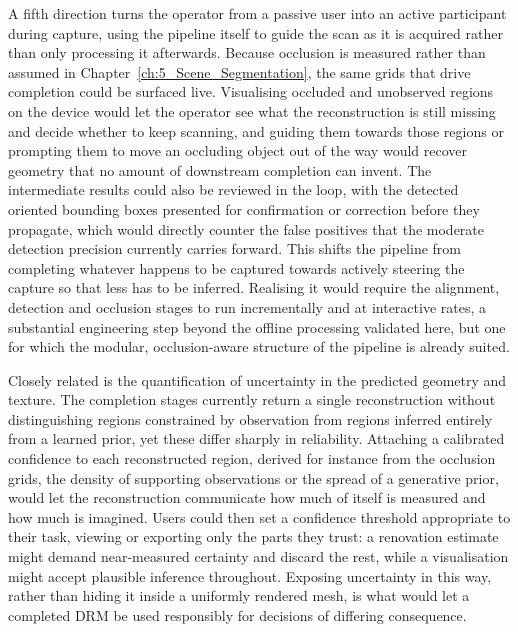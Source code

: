 A fifth direction turns the operator from a passive user into an active participant during capture, using the pipeline itself to guide the scan as it is acquired rather than only processing it afterwards. Because occlusion is measured rather than assumed in Chapter~\ref{ch:5_Scene_Segmentation}, the same grids that drive completion could be surfaced live. Visualising occluded and unobserved regions on the device would let the operator see what the reconstruction is still missing and decide whether to keep scanning, and guiding them towards those regions or prompting them to move an occluding object out of the way would recover geometry that no amount of downstream completion can invent. The intermediate results could also be reviewed in the loop, with the detected oriented bounding boxes presented for confirmation or correction before they propagate, which would directly counter the false positives that the moderate detection precision currently carries forward. This shifts the pipeline from completing whatever happens to be captured towards actively steering the capture so that less has to be inferred. Realising it would require the alignment, detection and occlusion stages to run incrementally and at interactive rates, a substantial engineering step beyond the offline processing validated here, but one for which the modular, occlusion-aware structure of the pipeline is already suited.

Closely related is the quantification of uncertainty in the predicted geometry and texture. The completion stages currently return a single reconstruction without distinguishing regions constrained by observation from regions inferred entirely from a learned prior, yet these differ sharply in reliability. Attaching a calibrated confidence to each reconstructed region, derived for instance from the occlusion grids, the density of supporting observations or the spread of a generative prior, would let the reconstruction communicate how much of itself is measured and how much is imagined. Users could then set a confidence threshold appropriate to their task, viewing or exporting only the parts they trust: a renovation estimate might demand near-measured certainty and discard the rest, while a visualisation might accept plausible inference throughout. Exposing uncertainty in this way, rather than hiding it inside a uniformly rendered mesh, is what would let a completed \gls{DRM} be used responsibly for decisions of differing consequence.


\cleardoublepage